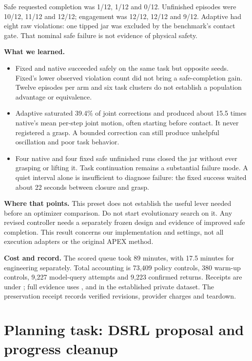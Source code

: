 \documentclass[11pt,a4paper]{article}
\begin{document}
Safe requested completion was 1/12, 1/12 and 0/12. Unfinished episodes were 10/12, 11/12 and 12/12; engagement was 12/12, 12/12 and 9/12. Adaptive had eight raw violations: one tipped jar was excluded by the benchmark's contact gate. That nominal safe failure is not evidence of physical safety.

\textbf{What we learned.}
\begin{itemize}\setlength\itemsep{1pt}
  \item Fixed and native succeeded safely on the same task but opposite seeds. Fixed's lower observed violation count did not bring a safe-completion gain. Twelve episodes per arm and six task clusters do not establish a population advantage or equivalence.
  \item Adaptive saturated 39.4\% of joint corrections and produced about 15.5 times native's mean per-step joint motion, often starting before contact. It never registered a grasp. A bounded correction can still produce unhelpful oscillation and poor task behavior.
  \item Four native and four fixed safe unfinished runs closed the jar without ever grasping or lifting it. Task continuation remains a substantial failure mode. A quiet interval alone is insufficient to diagnose failure: the fixed success waited about 22 seconds between closure and grasp.
\end{itemize}

\textbf{Where that points.} This preset does not establish the useful lever needed before an optimizer comparison. Do not start evolutionary search on it. Any revised controller needs a separately frozen design and evidence of improved safe completion. This result concerns our implementation and settings, not all execution adapters or the original APEX method.

\textbf{Cost and record.} The scored queue took 89 minutes, with 17.5 minutes for engineering separately. Total accounting is 73,409 policy controls, 380 warm-up controls, 9,227 model-query attempts and 9,223 confirmed returns. Receipts are under ; full evidence uses ,  and  in the established private dataset. The preservation receipt records verified revisions, provider charges and teardown.
\newpage
\section*{Planning task: DSRL proposal and progress cleanup}
\end{document}
